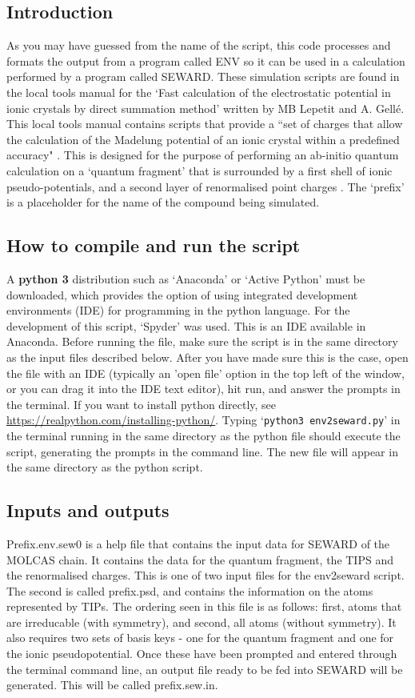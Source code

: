 \documentclass[10pt]{article}
\begin{document}
\subsection{Introduction}
As you may have guessed from the name of the script, this code processes and formats the output from a program called ENV so it can be used in a calculation performed by a program called SEWARD. These simulation scripts are found in the local tools manual for the `Fast calculation of the electrostatic potential in ionic crystals by direct summation method' written by MB Lepetit and A. Gellé. This local tools manual contains scripts that provide a ``set of charges that allow the calculation of the Madelung potential of an ionic crystal within a predefined accuracy" \cite{gelle2008fast}. This is designed for the purpose of performing an ab-initio quantum calculation on a `quantum fragment' that is surrounded by a first shell of ionic pseudo-potentials, and a second layer of renormalised point charges \cite{varignon2013ab}. The `prefix' is a placeholder for the name of the compound being simulated.

\subsection{How to compile and run the script}
A {\bf python 3} distribution such as `Anaconda' or `Active Python' must be downloaded, which provides the option of using integrated development environments (IDE) for programming in the python language. For the development of this script, `Spyder' was used. This is an IDE available in Anaconda. Before running the file, make sure the script is in the same directory as the input files described below. After you have made sure this is the case, open the file with an IDE (typically an 'open file' option in the top left of the window, or you can drag it into the IDE text editor), hit run, and answer the prompts in the terminal. If you want to install python directly, see \url{https://realpython.com/installing-python/}. Typing `\texttt{python3 env2seward.py}' in the terminal running in the same directory as the python file should execute the script, generating the prompts in the command line. The new file will appear in the same directory as the python script.

\subsection{Inputs and outputs}
Prefix.env.sew0 is a help file that contains the input data for SEWARD of the MOLCAS chain. It contains the data for the quantum fragment, the TIPS and the renormalised charges. This is one of two input files for the env2seward script. The second is called prefix.psd, and contains the information on the atoms represented by TIPs. The ordering seen in this file is as follows: first, atoms that are irreducable (with symmetry), and second, all atoms (without symmetry). It also requires two sets of basis keys - one for the quantum fragment and one for the ionic pseudopotential. Once these have been prompted and entered through the terminal command line, an output file ready to be fed into SEWARD will be generated. This will be called prefix.sew.in.
\end{document}

